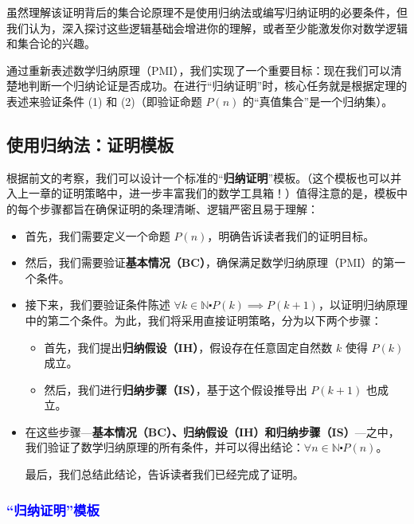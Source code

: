 虽然理解该证明背后的集合论原理不是使用归纳法或编写归纳证明的必要条件，但我们认为，深入探讨这些逻辑基础会增进你的理解，或者至少能激发你对数学逻辑和集合论的兴趣。

通过重新表述数学归纳原理（PMI），我们实现了一个重要目标：现在我们可以清楚地判断一个归纳论证是否成功。在进行``归纳证明''时，核心任务就是根据定理的表述来验证条件 (1) 和 (2)（即验证命题 $P(n)$ 的``真值集合''是一个归纳集）。

\subsection{使用归纳法：证明模板}

根据前文的考察，我们可以设计一个标准的``\textbf{归纳证明}''模板。（这个模板也可以并入上一章的证明策略中，进一步丰富我们的数学工具箱！）值得注意的是，模板中的每个步骤都旨在确保证明的条理清晰、逻辑严密且易于理解：

\begin{itemize}
    \item 首先，我们需要定义一个命题 $P(n)$，明确告诉读者我们的证明目标。
    \item 然后，我们需要验证\textbf{基本情况（BC）}，确保满足数学归纳原理（PMI）的第一个条件。
    \item 接下来，我们要验证条件陈述 $\forall k \in \mathbb{N} \centerdot P(k) \implies P(k+1)$，以证明归纳原理中的第二个条件。为此，我们将采用直接证明策略，分为以下两个步骤：
        \begin{itemize}
            \item 首先，我们提出\textbf{归纳假设（IH）}，假设存在任意固定自然数 $k$ 使得 $P(k)$ 成立。
            \item 然后，我们进行\textbf{归纳步骤（IS）}，基于这个假设推导出 $P(k+1)$ 也成立。
        \end{itemize} 
    \item 在这些步骤---\textbf{基本情况（BC）、归纳假设（IH）和归纳步骤（IS）}---之中，我们验证了数学归纳原理的所有条件，并可以得出结论：$\forall n \in \mathbb{N} \centerdot P(n)$。
    
    最后，我们总结此结论，告诉读者我们已经完成了证明。
\end{itemize}

\subsubsection*{\textcolor{blue}{``归纳证明''模板}}

